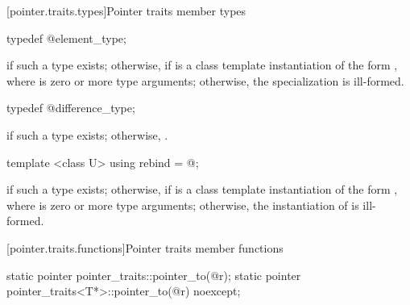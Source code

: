 [pointer.traits.types]{Pointer traits member types}

%
%
\begin{itemdecl}
typedef @\seebelow@ element_type;
\end{itemdecl}

\begin{itemdescr}
\pnum
\ctype {} if such a type exists; otherwise,  if
 is a class template instantiation of the form ,
where  is zero or more type arguments; otherwise, the specialization is
ill-formed.
\end{itemdescr}

%
%
\begin{itemdecl}
typedef @\seebelow@ difference_type;
\end{itemdecl}

\begin{itemdescr}
\pnum
\ctype {} if such a type exists; otherwise,
.
\end{itemdescr}

%
%
\begin{itemdecl}
template <class U> using rebind = @\seebelow@;
\end{itemdecl}

\begin{itemdescr}
\pnum
\templalias {} if such a type exists; otherwise,
 if
 is a class template instantiation of the form ,
where  is zero or more type arguments; otherwise, the instantiation of
 is ill-formed.
\end{itemdescr}

[pointer.traits.functions]{Pointer traits member functions}

%
%
\begin{itemdecl}
static pointer pointer_traits::pointer_to(@\seebelow@ r);
static pointer pointer_traits<T*>::pointer_to(@\seebelow@ r) noexcept;
\end{itemdecl}

